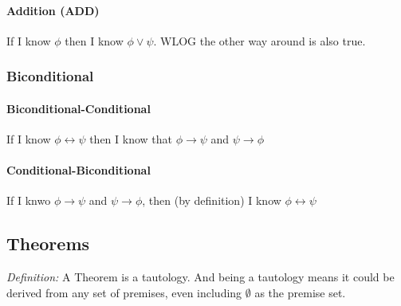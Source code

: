 \documentclass[10pt]{article}
\renewcommand{\iff}{\leftrightarrow}
\begin{document}
\paragraph{Addition (ADD)} If I know $\phi$ then  I know $\phi \vee \psi$.
 WLOG the other way around is also true.

\subsubsection{Biconditional}
\paragraph{Biconditional-Conditional} If I know $\phi \iff \psi$ then I 
know that $\phi \rightarrow \psi$ and $\psi \rightarrow \phi$
\paragraph{Conditional-Biconditional} If I knwo $\phi \rightarrow \psi$ 
and $\psi \rightarrow \phi$, then (by definition) I know  $\phi \iff \psi$



\subsection{Theorems}
\textit{Definition:} A Theorem is a tautology. And being a tautology 
means it could be derived from any set of premises, even including
 $\emptyset$ as the premise set.
\end{document}
